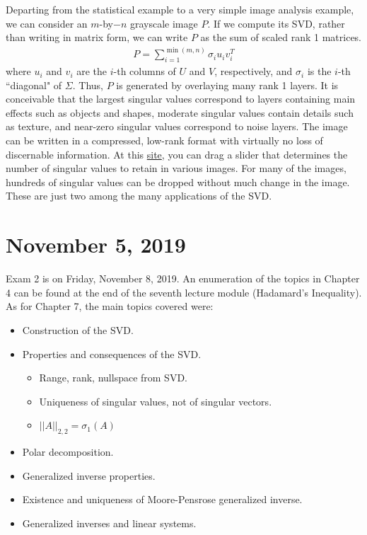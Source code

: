 \documentclass[11pt]{article}
\theoremstyle{plain}
\theoremstyle{definition}
\theoremstyle{remark}
\begin{document}
Departing from the statistical example to a very simple image analysis example, we can consider an $m$-by$-n$ grayscale image $P$. If we compute its SVD, rather than writing in matrix form, we can write $P$ as the sum of scaled rank 1 matrices.
\begin{align*}
    P = \sum_{i=1}^{\min(m,n)} \sigma_i u_i v_i^T
\end{align*}
where $u_i$ and $v_i$ are the $i$-th columns of $U$ and $V$, respectively, and $\sigma_i$ is the $i$-th ``diagonal" of $\Sigma$. Thus, $P$ is generated by overlaying many rank 1 layers. It is conceivable that the largest singular values correspond to layers containing main effects such as objects and shapes, moderate singular values contain details such as texture, and near-zero singular values correspond to noise layers. The image can be written in a compressed, low-rank format with virtually no loss of discernable information. At this \href{http://timbaumann.info/svd-image-compression-demo/}{site}, you can drag a slider that determines the number of singular values to retain in various images. For many of the images, hundreds of singular values can be dropped without much change in the image. These are just two among the many applications of the SVD.

\section{November 5, 2019}

Exam 2 is on Friday, November 8, 2019. An enumeration of the topics in Chapter 4 can be found at the end of the seventh lecture module (Hadamard's Inequality). As for Chapter 7, the main topics covered were:
\begin{itemize}
    \item Construction of the SVD.
    \item Properties and consequences of the SVD.
    \begin{itemize}
        \item Range, rank, nullspace from SVD.
        \item Uniqueness of singular values, not of singular vectors.
        \item $||A||_{2,2} = \sigma_1(A)$
    \end{itemize}
    \item Polar decomposition.
    \item Generalized inverse properties.
    \item Existence and uniqueness of Moore-Pensrose generalized inverse.
    \item Generalized inverses and linear systems.
\end{itemize}
\end{document}
